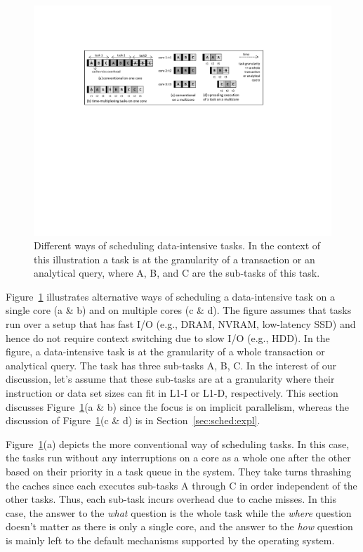 \documentclass[11pt,dvipdfm]{article}
\newcommand{\reffig}[1]{Figure~\ref{fig:#1}}
\newcommand{\refsec}[1]{Section~\ref{sec:#1}}
\begin{document}
\begin{figure}
\centering
\includegraphics{figs/fig-sched.pdf}
\caption{Different ways of scheduling data-intensive tasks.
In the context of this illustration a task is at the granularity of a transaction or an analytical query,
where A, B, and C are the sub-tasks of this task.}
\label{fig:sched}
\end{figure}

\reffig{sched} illustrates alternative ways of scheduling a data-intensive task
on a single core (a \& b) and on multiple cores (c \& d).
The figure assumes that tasks run over a setup that has fast I/O (e.g., DRAM, NVRAM, low-latency SSD)
and hence do not require context switching due to slow I/O (e.g., HDD).
In the figure, a data-intensive task is at the granularity of a whole transaction or analytical query.
The task has three sub-tasks A, B, C.
In the interest of our discussion, let's assume that these sub-tasks are at a granularity
where their instruction or data set sizes can fit in L1-I or L1-D, respectively.
This section discusses \reffig{sched}(a \& b) since the focus is on implicit parallelism,
whereas the discussion of \reffig{sched}(c \& d) is in \refsec{sched:expl}.

\reffig{sched}(a) depicts the more conventional way of scheduling tasks.
In this case, the tasks run without any interruptions on a core as a whole one after the other
based on their priority in a task queue in the system.
They take turns thrashing the caches since each executes sub-tasks A through
C in order independent of the other tasks.
Thus, each sub-task incurs overhead due to cache misses.
In this case,
the answer to the \textit{what} question is the whole task
while the \textit{where} question doesn't matter as there is only a single core,
and the answer to the \textit{how} question is mainly left to the default mechanisms
supported by the operating system.
\end{document}
